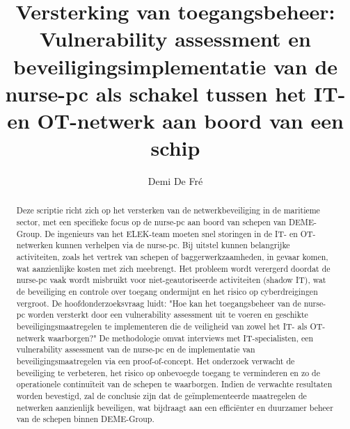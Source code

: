 \documentclass{hogent-article}
\title{Versterking van toegangsbeheer: Vulnerability assessment en 
beveiligingsimplementatie van de nurse-pc als schakel tussen het IT- en OT-netwerk aan boord van een schip}
\author{Demi De Fré}
\begin{document}
\begin{abstract}
  Deze scriptie richt zich op het versterken van de netwerkbeveiliging in de maritieme sector, met een specifieke focus op de nurse-pc aan boord van schepen van DEME-Group. 
  De ingenieurs van het ELEK-team moeten snel storingen in de IT- en OT-netwerken kunnen verhelpen via de nurse-pc. 
  Bij uitstel kunnen belangrijke activiteiten, zoals het vertrek van schepen of baggerwerkzaamheden, in gevaar komen, wat aanzienlijke kosten met zich meebrengt. 
  Het probleem wordt verergerd doordat de nurse-pc vaak wordt misbruikt voor niet-geautoriseerde activiteiten (shadow IT), wat de beveiliging en controle over toegang 
  ondermijnt en het risico op cyberdreigingen vergroot. De hoofdonderzoeksvraag luidt: "Hoe kan het toegangsbeheer van de nurse-pc worden versterkt door een vulnerability 
  assessment uit te voeren en geschikte beveiligingsmaatregelen te implementeren die de veiligheid van zowel het IT- als OT-netwerk waarborgen?" 
  De methodologie omvat interviews met IT-specialisten, een vulnerability assessment van de nurse-pc en de implementatie van beveiligingsmaatregelen via een proof-of-concept. 
  Het onderzoek verwacht de beveiliging te verbeteren, het risico op onbevoegde toegang te verminderen en zo de operationele continuïteit van de schepen te waarborgen. 
  Indien de verwachte resultaten worden bevestigd, zal de conclusie zijn dat de geïmplementeerde maatregelen de netwerken aanzienlijk beveiligen, wat bijdraagt aan een efficiënter en duurzamer 
  beheer van de schepen binnen DEME-Group.
\end{abstract}

\tableofcontents



\printbibliography[heading=bibintoc]
\end{document}
